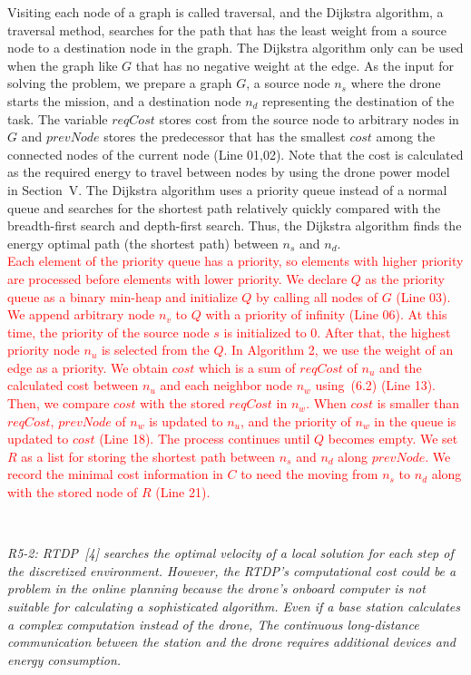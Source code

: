\documentclass[onecolumn]{IEEEconf}
\begin{document}
\begin{description}
\begin{mdframed}[ linewidth=.75pt, userdefinedwidth=0.9\textwidth]
{    Visiting each node of a graph is called traversal, and the Dijkstra algorithm, a traversal method, searches for the path that has the least weight from a source node to a destination node in the graph. The Dijkstra algorithm only can be used when the graph like $G$ that has no negative weight at the edge.
    As the input for solving the problem, we prepare a graph $G$, a source node $n_s$ where the drone starts the mission, and a destination node $n_d$ representing the destination of the task.
    The variable $reqCost$ stores cost from the source node to arbitrary nodes in $G$ and $prevNode$ stores the predecessor that has the smallest $cost$ among the connected nodes of the current node (Line 01,02). 
    Note that the cost is calculated as the required energy to travel between nodes by using the drone power model in Section~V.
    The Dijkstra algorithm uses a priority queue instead of a normal queue and searches for the shortest path relatively quickly compared with the breadth-first search and depth-first search.
    Thus, the Dijkstra algorithm finds the energy optimal path (the shortest path) between $n_s$ and $n_d$.}~\\
    \textcolor{red}{Each element of the priority queue has a priority, so elements with higher priority are processed before elements with lower priority.
    We declare $Q$ as the priority queue as a binary min-heap and initialize $Q$ by calling all nodes of $G$ (Line 03).
    We append arbitrary node $n_v$ to $Q$ with a priority of infinity (Line 06). 
    At this time, the priority of the source node $s$ is initialized to 0.
    After that, the highest priority node $n_u$ is selected from the $Q$. 
    In Algorithm 2, we use the weight of an edge as a priority.
    We obtain $cost$ which is a sum of $reqCost$ of $n_u$ and the calculated cost between $n_u$ and each neighbor node $n_w$ using~(6.2) (Line 13). 
    Then, we compare $cost$ with the stored $reqCost$ in $n_w$.
    When $cost$ is smaller than $reqCost$, $prevNode$ of $n_w$ is updated to $n_u$, and the priority of $n_w$ in the queue is updated to $cost$ (Line 18).
    The process continues until $Q$ becomes empty.
    We set $R$ as a list for storing the shortest path between $n_s$ and $n_d$ along $prevNode$.
    We record the minimal cost information in $C$ to need the moving from $n_s$ to $n_d$ along with the stored node of $R$ (Line 21).
    }
    \end{mdframed} 
    ~\\
	\item \textit
	{
	R5-2: RTDP~[4] searches the optimal velocity of a local solution for each step of the discretized environment. However, the RTDP’s computational cost could be a problem in the online planning because the drone’s onboard computer is not suitable for calculating a sophisticated algorithm. Even if a base station calculates a complex computation instead of the drone, The continuous long-distance communication between the station and the drone requires additional devices and energy consumption.
}
\end{description}
\end{document}
